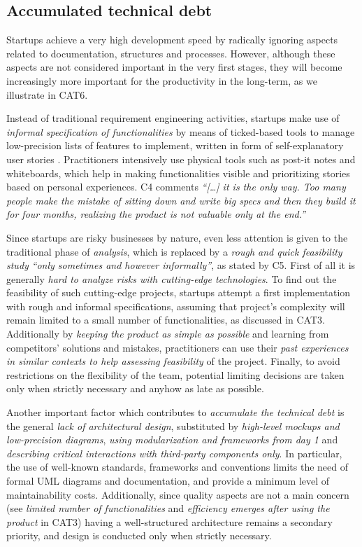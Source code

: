 \documentclass[10pt,journal,letterpaper,compsoc]{IEEEtran}
\begin{document}
\subsection{Accumulated technical debt}
\label{res:gsm:cat5}
Startups achieve a very high development speed by radically ignoring aspects related to documentation, structures and processes. However, although these aspects are not considered important in the very first stages, they will become increasingly more important for the productivity in the long-term, as we illustrate in CAT6.


Instead of traditional requirement engineering activities, startups make use of \textit{informal specification of functionalities} by means of ticked-based tools to manage low-precision lists of features to implement, written in form of self-explanatory user stories \cite{AgilePlan}. Practitioners intensively use physical tools such as post-it notes and whiteboards, which help in making functionalities visible and prioritizing stories based on personal experiences. C4 comments \textit{``[\ldots] it is the only way. Too many people make the mistake of sitting down and write big specs and then they build it for four months, realizing the product is not valuable only at the end.''}

Since startups are risky businesses by nature, even less attention is given to the traditional phase of \textit{analysis}, which is replaced by a \textit{rough and quick feasibility study}   \textit{``only sometimes and however informally''}, as stated by C5.  First of all it is generally \textit{hard to analyze risks with cutting-edge technologies}. To find out the feasibility of such cutting-edge projects, startups attempt a first implementation with rough and informal specifications, assuming that project's complexity will remain limited to a small number of functionalities, as discussed in CAT3. Additionally by \textit{keeping the product as simple as possible} and learning from competitors' solutions and mistakes, practitioners can use their \textit{past experiences in similar contexts to help assessing feasibility} of the project. Finally, to avoid restrictions on the flexibility of the team, potential limiting decisions are taken only when strictly necessary and anyhow as late as possible.

Another important factor which contributes to \textit{accumulate the technical debt} is the general \textit{lack of architectural design}, substituted by \textit{high-level mockups and low-precision diagrams}, \textit{using modularization and frameworks from day 1} and \textit{describing critical interactions with third-party components only}. In particular, the use of well-known standards, frameworks and conventions limits the need of formal UML \cite{UML} diagrams and documentation, and provide a minimum level of maintainability costs. Additionally, since quality aspects are not a main concern (see \textit{limited number of functionalities} and \textit{efficiency emerges after using the product} in CAT3) having a well-structured architecture remains a secondary priority, and design is conducted only when strictly necessary.
\end{document}
